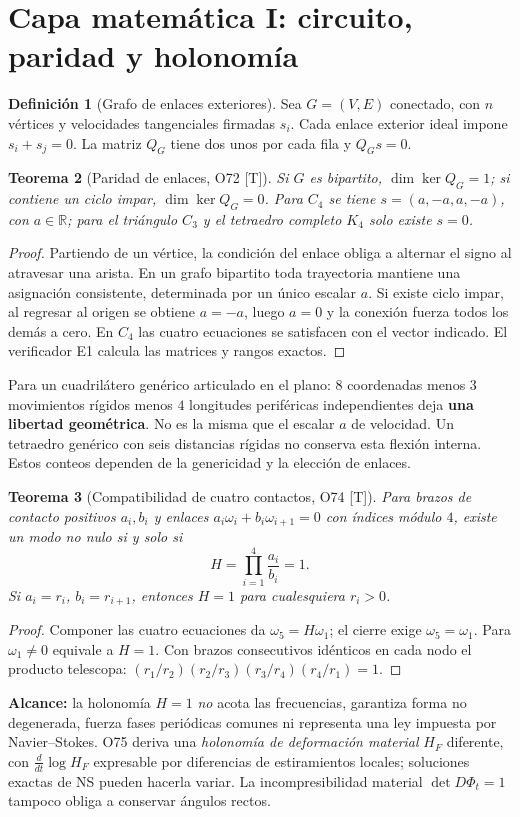 \documentclass[11pt,a4paper]{article}
\newtheorem{teo}{Teorema}[section]
\theoremstyle{definition}\newtheorem{defi}[teo]{Definición}
\newcommand{\RR}{\mathbb{R}}\newcommand{\TT}{\mathbb{T}}
\newcommand{\stat}[1]{\textcolor{blue!50!black}{\textsf{[#1]}}}
\begin{document}
\section{Capa matemática I: circuito, paridad y holonomía}
\begin{defi}[Grafo de enlaces exteriores]
Sea $G=(V,E)$ conectado, con $n$ vértices y velocidades tangenciales firmadas $s_i$. Cada enlace exterior ideal impone $s_i+s_j=0$. La matriz $Q_G$ tiene dos unos por cada fila y $Q_Gs=0$.
\end{defi}
\begin{teo}[Paridad de enlaces, O72 \stat{T}]
Si $G$ es bipartito, $\dim\ker Q_G=1$; si contiene un ciclo impar, $\dim\ker Q_G=0$. Para $C_4$ se tiene $s=(a,-a,a,-a)$, con $a\in\RR$; para el triángulo $C_3$ y el tetraedro completo $K_4$ solo existe $s=0$.
\end{teo}
\begin{proof}
Partiendo de un vértice, la condición del enlace obliga a alternar el signo al atravesar una arista. En un grafo bipartito toda trayectoria mantiene una asignación consistente, determinada por un único escalar $a$. Si existe ciclo impar, al regresar al origen se obtiene $a=-a$, luego $a=0$ y la conexión fuerza todos los demás a cero. En $C_4$ las cuatro ecuaciones se satisfacen con el vector indicado. El verificador E1 calcula las matrices y rangos exactos.
\end{proof}
Para un cuadrilátero genérico articulado en el plano: $8$ coordenadas menos $3$ movimientos rígidos menos $4$ longitudes periféricas independientes deja \textbf{una libertad geométrica}. No es la misma que el escalar $a$ de velocidad. Un tetraedro genérico con seis distancias rígidas no conserva esta flexión interna. Estos conteos dependen de la genericidad y la elección de enlaces.

\begin{teo}[Compatibilidad de cuatro contactos, O74 \stat{T}]
Para brazos de contacto positivos $a_i,b_i$ y enlaces $a_i\omega_i+b_i\omega_{i+1}=0$ con índices módulo $4$, existe un modo no nulo si y solo si
\begin{equation}\label{eq:H}H=\prod_{i=1}^{4}\frac{a_i}{b_i}=1.\end{equation}
Si $a_i=r_i$, $b_i=r_{i+1}$, entonces $H=1$ para cualesquiera $r_i>0$.
\end{teo}
\begin{proof}
Componer las cuatro ecuaciones da $\omega_5=H\omega_1$; el cierre exige $\omega_5=\omega_1$. Para $\omega_1\ne0$ equivale a $H=1$. Con brazos consecutivos idénticos en cada nodo el producto telescopa: $(r_1/r_2)(r_2/r_3)(r_3/r_4)(r_4/r_1)=1$.
\end{proof}
\noindent\textbf{Alcance:} la holonomía $H=1$ \emph{no} acota las frecuencias, garantiza forma no degenerada, fuerza fases periódicas comunes ni representa una ley impuesta por Navier--Stokes. O75 deriva una \emph{holonomía de deformación material} $H_F$ diferente, con $\frac{d}{dt}\log H_F$ expresable por diferencias de estiramientos locales; soluciones exactas de NS pueden hacerla variar. La incompresibilidad material $\det D\Phi_t=1$ tampoco obliga a conservar ángulos rectos.
\end{document}
